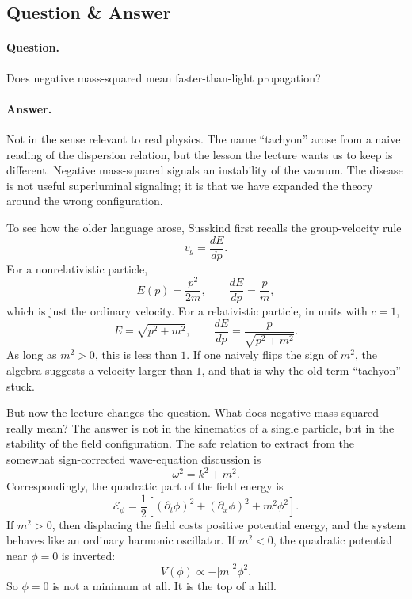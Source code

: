 \subsection{Question \& Answer}

\paragraph{Question.} Does negative mass-squared mean faster-than-light propagation?

\paragraph{Answer.} Not in the sense relevant to real physics. The name ``tachyon'' arose from a naive reading of the dispersion relation, but the lesson the lecture wants us to keep is different. Negative mass-squared signals an instability of the vacuum. The disease is not useful superluminal signaling; it is that we have expanded the theory around the wrong configuration.

To see how the older language arose, Susskind first recalls the group-velocity rule
\begin{equation}
v_g=\frac{dE}{dp}.
\end{equation}
For a nonrelativistic particle,
\begin{equation}
E(p)=\frac{p^2}{2m},
\qquad
\frac{dE}{dp}=\frac{p}{m},
\end{equation}
which is just the ordinary velocity. For a relativistic particle, in units with \(c=1\),
\begin{equation}
E=\sqrt{p^2+m^2},
\qquad
\frac{dE}{dp}=\frac{p}{\sqrt{p^2+m^2}}.
\end{equation}
As long as \(m^2>0\), this is less than \(1\). If one naively flips the sign of \(m^2\), the algebra suggests a velocity larger than \(1\), and that is why the old term ``tachyon'' stuck.

But now the lecture changes the question. What does negative mass-squared really mean? The answer is not in the kinematics of a single particle, but in the stability of the field configuration. The safe relation to extract from the somewhat sign-corrected wave-equation discussion is
\begin{equation}
\omega^2=k^2+m^2.
\end{equation}
Correspondingly, the quadratic part of the field energy is
\begin{equation}
\mathcal{E}_\phi
=
\frac12\left[(\partial_t\phi)^2+(\partial_x\phi)^2+m^2\phi^2\right].
\end{equation}
If \(m^2>0\), then displacing the field costs positive potential energy, and the system behaves like an ordinary harmonic oscillator. If \(m^2<0\), the quadratic potential near \(\phi=0\) is inverted:
\begin{equation}
V(\phi)\propto -|m|^2\phi^2.
\end{equation}
So \(\phi=0\) is not a minimum at all. It is the top of a hill.

